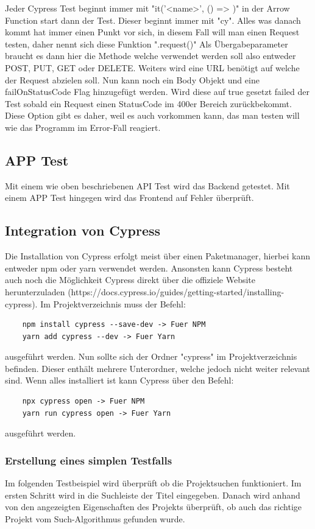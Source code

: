 Jeder Cypress Test beginnt immer mit "it('<name>', () => {})" in der Arrow Function start dann der Test. Dieser beginnt immer mit "cy". Alles was danach kommt hat immer einen Punkt vor sich, in diesem Fall will man einen Request testen, daher nennt sich diese Funktion ".request({})" Als Übergabeparameter braucht es dann hier die Methode welche verwendet werden soll also entweder POST, PUT, GET oder DELETE. Weiters wird eine URL benötigt auf welche der Request abzielen soll. Nun kann noch ein Body Objekt und eine failOnStatusCode Flag hinzugefügt werden. Wird diese auf true gesetzt failed der Test sobald ein Request einen StatusCode im 400er Bereich zurückbekommt. Diese Option gibt es daher, weil es auch vorkommen kann, das man testen will wie das Programm im Error-Fall reagiert.
\cite{API_Tests}
\subsection{APP Test}
Mit einem wie oben beschriebenen API Test wird das Backend getestet. Mit einem APP Test hingegen wird das Frontend auf Fehler überprüft. 


\subsection{Integration von Cypress}
Die Installation von Cypress erfolgt meist über einen Paketmanager, hierbei kann entweder npm oder yarn verwendet werden. Ansonsten kann Cypress besteht auch noch die Möglichkeit Cypress direkt über die offiziele Website herunterzuladen (https://docs.cypress.io/guides/getting-started/installing-cypress).
Im Projektverzeichnis muss der Befehl:

\begin{lstlisting}
    npm install cypress --save-dev -> Fuer NPM
    yarn add cypress --dev -> Fuer Yarn
\end{lstlisting}

ausgeführt werden.
Nun sollte sich der Ordner "cypress" im Projektverzeichnis befinden. Dieser enthält mehrere Unterordner, welche jedoch nicht weiter relevant sind. Wenn alles installiert ist kann Cypress über den Befehl:

\begin{lstlisting}
    npx cypress open -> Fuer NPM
    yarn run cypress open -> Fuer Yarn
\end{lstlisting}

ausgeführt werden.
\cite{Integration_von_Cypress}

\subsubsection{Erstellung eines simplen Testfalls}
Im folgenden Testbeispiel wird überprüft ob die Projektsuchen funktioniert. Im ersten Schritt wird in die Suchleiste der Titel eingegeben. Danach wird anhand von den angezeigten Eigenschaften des Projekts überprüft, ob auch das richtige Projekt vom Such-Algorithmus gefunden wurde. 

